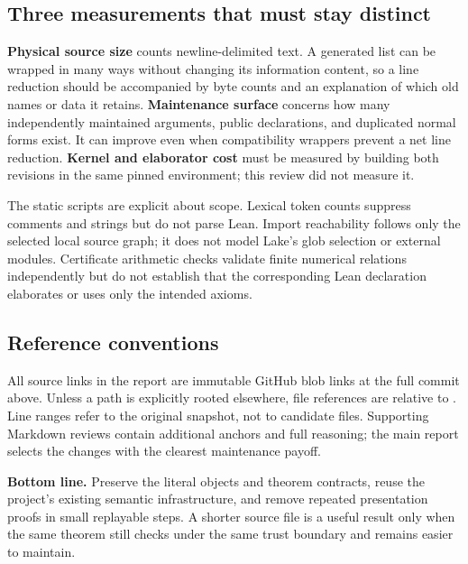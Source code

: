 \subsection{Three measurements that must stay distinct}

\textbf{Physical source size} counts newline-delimited text. A generated list
can be wrapped in many ways without changing its information content, so a
line reduction should be accompanied by byte counts and an explanation of
which old names or data it retains. \textbf{Maintenance surface} concerns how
many independently maintained arguments, public declarations, and duplicated
normal forms exist. It can improve even when compatibility wrappers prevent
a net line reduction. \textbf{Kernel and elaborator cost} must be measured by
building both revisions in the same pinned environment; this review did not
measure it.

The static scripts are explicit about scope. Lexical token counts suppress
comments and strings but do not parse Lean. Import reachability follows only
the selected local source graph; it does not model Lake's glob selection or
external modules. Certificate arithmetic checks validate finite numerical
relations independently but do not establish that the corresponding Lean
declaration elaborates or uses only the intended axioms.

\subsection{Reference conventions}

All source links in the report are immutable GitHub blob links at the full
commit above. Unless a path is explicitly rooted elsewhere, file references
are relative to
.
Line ranges refer to the original snapshot, not to candidate files.
Supporting Markdown reviews contain additional anchors and full reasoning;
the main report selects the changes with the clearest maintenance payoff.

\textbf{Bottom line.} Preserve the literal objects and theorem contracts,
reuse the project's existing semantic infrastructure, and remove repeated
presentation proofs in small replayable steps. A shorter source file is a
useful result only when the same theorem still checks under the same trust
boundary and remains easier to maintain.
